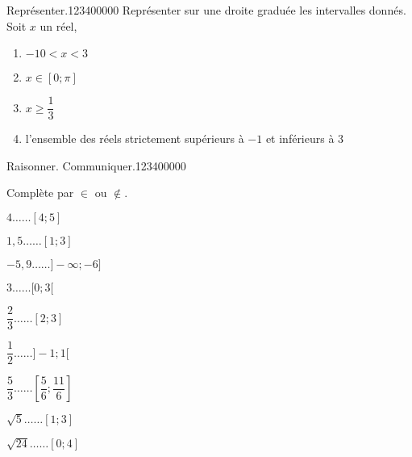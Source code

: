\begin{pageAD}
\begin{ExoCad}{Représenter.}{1234}{0}{0}{0}{0}{0}
Représenter sur une droite graduée les intervalles donnés. Soit $x$ un réel,
\begin{enumerate}[leftmargin=*]
	\item $-10< x < 3$  
	\item $ x \in [0;\pi]$  
	\item $ x \geq \dfrac{1}{3}$  
	\item l'ensemble des réels strictement supérieurs à $-1$ et inférieurs à $3$  
\end{enumerate}
\end{ExoCad}


 
 
 
\begin{ExoCad}{Raisonner. Communiquer.}{1234}{0}{0}{0}{0}{0}

Complète par  $\in$ ou $\notin$.

\begin{enumerate}
\begin{minipage}{0.32\linewidth}
\item $4 \ldots \ldots [4;5]$ \vspace{0.1cm}
\item $1,5 \ldots \ldots [1;3]$\vspace{0.1cm}
\item $-5,9 \ldots \ldots ]-\infty;-6]$
\end{minipage}
\hfill
\begin{minipage}{0.32\linewidth}
\item $3 \ldots \ldots [0;3[$\vspace{0.1cm}
\item $\dfrac{2}{3} \ldots \ldots [2;3]$\vspace{0.1cm}
\item $\dfrac{1}{2} \ldots \ldots ]-1;1[$
\end{minipage}
\hfill
\begin{minipage}{0.32\linewidth}
\item $\dfrac{5}{3} \ldots \ldots \left[ \dfrac{5}{6}; \dfrac{11}{6}  \right]$ 
\item $\sqrt{5} \ldots \ldots \left[ 1;3 \right]$\vspace{0.1cm}
\item $\sqrt{24} \ldots \ldots \left[0; 4\right]$ 
\end{minipage}

\end{enumerate}
 
\end{ExoCad}
 
 
 
\end{pageAD}
 
